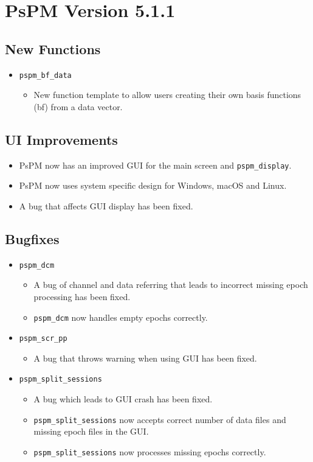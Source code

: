 \documentclass[english]{article}
\numberwithin{equation}{section}
\numberwithin{figure}{section}
\begin{document}
\section{PsPM Version 5.1.1}
\subsection*{New Functions}
\begin{itemize}
\item \texttt{pspm\_bf\_data}
\begin{itemize}
\item New function template to allow users creating their own basis functions (bf) from a data vector.
\end{itemize}
\end{itemize}
\subsection*{UI Improvements}
\begin{itemize}
\item PsPM now has an improved GUI for the main screen and \texttt{pspm\_display}.
\item PsPM now uses system specific design for Windows, macOS and Linux.
\item A bug that affects GUI display has been fixed.
\end{itemize}
\subsection*{Bugfixes}
\begin{itemize}
\item \texttt{pspm\_dcm}
\begin{itemize}
\item A bug of channel and data referring that leads to incorrect missing epoch processing has been fixed.
\item \texttt{pspm\_dcm} now handles empty epochs correctly.
\end{itemize}
\item \texttt{pspm\_scr\_pp}
\begin{itemize}
\item A bug that throws warning when using GUI has been fixed.
\end{itemize}
\item \texttt{pspm\_split\_sessions}
\begin{itemize}
\item A bug which leads to GUI crash has been fixed.
\item \texttt{pspm\_split\_sessions} now accepts correct number of data files and missing epoch files in the GUI.
\item \texttt{pspm\_split\_sessions} now processes missing epochs correctly.
\end{itemize}
\end{itemize}
\end{document}
